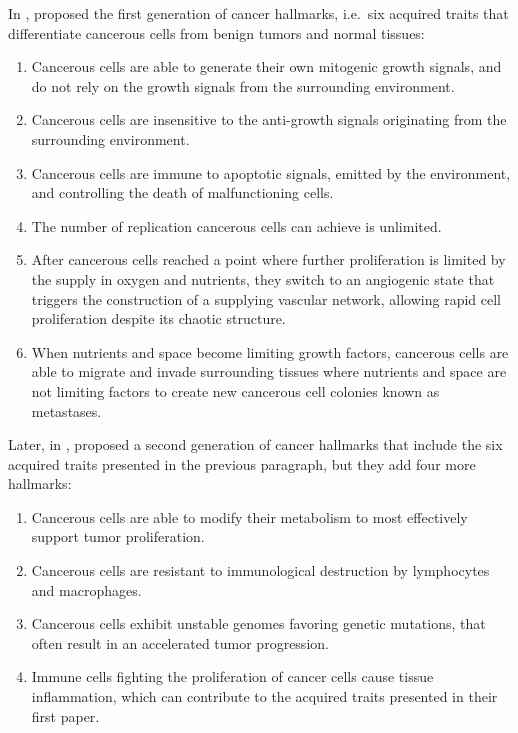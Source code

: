 In \citeyear{Hanahan:2000hx}, \citet{Hanahan:2000hx} proposed the first generation of cancer hallmarks, i.e.~six acquired traits that differentiate cancerous cells from benign tumors and normal tissues:
\begin{enumerate}
    \item Cancerous cells are able to generate their own mitogenic growth signals, and do not rely on the growth signals from the surrounding environment.
    \item Cancerous cells are insensitive to the anti-growth signals originating from the surrounding environment.
    \item Cancerous cells are immune to apoptotic signals, emitted by the environment, and controlling the death of malfunctioning cells.
    \item The number of replication cancerous cells can achieve is unlimited.
    \item After cancerous cells reached a point where further proliferation is limited by the supply in oxygen and nutrients, they switch to an angiogenic state that triggers the construction of a supplying vascular network, allowing rapid cell proliferation despite its chaotic structure.
    \item When nutrients and space become limiting growth factors, cancerous cells are able to migrate and invade surrounding tissues where nutrients and space are not limiting factors to create new cancerous cell colonies known as metastases.
\end{enumerate}

Later, in \citeyear{Hanahan:2011gu}, \citet{Hanahan:2011gu} proposed a second generation of cancer hallmarks that include the six acquired traits presented in the previous paragraph, but they add four more hallmarks:
\begin{enumerate}
    \item Cancerous cells are able to modify their metabolism to most effectively support tumor proliferation.
    \item Cancerous cells are resistant to immunological destruction by lymphocytes and macrophages.
    \item Cancerous cells exhibit unstable genomes favoring genetic mutations, that often result in an accelerated tumor progression.
    \item Immune cells fighting the proliferation of cancer cells cause tissue inflammation, which can contribute to the acquired traits presented in their first paper.
\end{enumerate}

